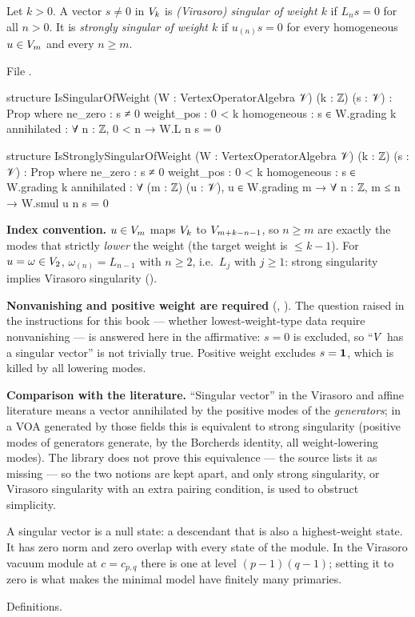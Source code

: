 \begin{definition}\label{l04:def:singular}
Let $k>0$. A vector $s\ne0$ in $V_k$ is \emph{(Virasoro) singular of weight $k$} if $L_ns = 0$
for all $n>0$. It is \emph{strongly singular of weight $k$} if $u_{(n)}s = 0$ for every homogeneous
$u\in V_m$ and every $n\ge m$.
\end{definition}
\noindent File .
\begin{leancode}
structure IsSingularOfWeight (W : VertexOperatorAlgebra 𝒱) (k : ℤ) (s : 𝒱) : Prop where
  ne_zero : s ≠ 0
  weight_pos : 0 < k
  homogeneous : s ∈ W.grading k
  annihilated : ∀ n : ℤ, 0 < n → W.L n s = 0

structure IsStronglySingularOfWeight (W : VertexOperatorAlgebra 𝒱) (k : ℤ) (s : 𝒱) : Prop where
  ne_zero : s ≠ 0
  weight_pos : 0 < k
  homogeneous : s ∈ W.grading k
  annihilated : ∀ (m : ℤ) (u : 𝒱), u ∈ W.grading m → ∀ n : ℤ, m ≤ n → W.smul u n s = 0
\end{leancode}
\begin{dictionary}
\textbf{Index convention.} $u\in V_m$ maps $V_k$ to $V_{m+k-n-1}$, so $n\ge m$ are
exactly the modes that strictly \emph{lower} the weight (the target weight is $\le k-1$). For $u =
\omega\in V_2$, $\omega_{(n)} = L_{n-1}$ with $n\ge2$, i.e.\ $L_j$ with $j\ge1$: strong singularity
implies Virasoro singularity (\allowbreak{}).

\textbf{Nonvanishing and positive weight are required} (, ). The
question raised in the instructions for this book --- whether lowest-weight-type data require
nonvanishing --- is answered here in the affirmative: $s = 0$ is excluded, so ``$V$ has a
singular vector'' is not trivially true. Positive weight excludes $s = \mathbf{1}$, which is killed by
all lowering modes.

\textbf{Comparison with the literature.} ``Singular vector'' in the Virasoro and affine literature
means a vector annihilated by the positive modes of the \emph{generators}; in a VOA generated by
those fields this is equivalent to strong singularity (positive modes of generators generate, by the
Borcherds identity, all weight-lowering modes). The library does not prove this equivalence --- the
source lists it as missing --- so the two notions are kept apart, and only strong singularity, or
Virasoro singularity with an extra pairing condition, is used to obstruct simplicity.
\end{dictionary}
\begin{physics}
A singular vector is a null state: a descendant that is also a highest-weight state. It has zero
norm and zero overlap with every state of the module. In the Virasoro vacuum module at $c = c_{p,q}$
there is one at level $(p-1)(q-1)$; setting it to zero is what makes the minimal model have finitely
many primaries.
\end{physics}
\begin{status}
Definitions.
\end{status}


